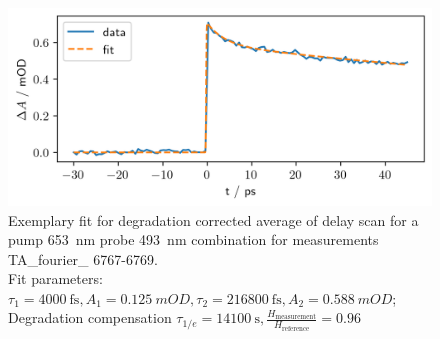 \documentclass[twoside,openright,listof=numbered]{scrreprt}
\begin{document}
\begin{figure}[hbtp]
\centering
\includegraphics[scale=1]{images/ExemplaryDelayScanFit_Pump653Probe493.png}
\caption[Exemplary fit for degradation corrected average of delay scan for a pump \SI{653}{\nano\meter} probe \SI{493}{\nano\meter} combination for measurements TA\_fourier\_ 6767-6769.]{Exemplary fit for degradation corrected average of delay scan for a pump \SI{653}{\nano\meter} probe \SI{493}{\nano\meter} combination for measurements TA\_fourier\_ 6767-6769.\\Fit parameters: $\tau_1 = \SI{4000}{\femto\second}, A_1 = \SI{0.125}{mOD}, \tau_2 = \SI{216800}{\femto\second}, A_2 = \SI{0.588}{mOD}$; Degradation compensation $\tau_{1/e} = \SI{14100}{\second}, \frac{H_\mathrm{measurement}}{H_\mathrm{reference}} = 0.96$ \label{fig:delayFitExample}}
\end{figure}
\end{document}
